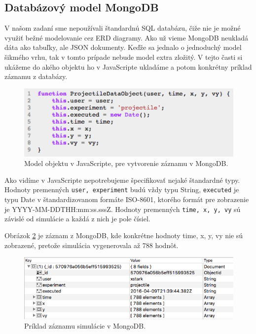 \subsection{Databázový model MongoDB}
V našom zadaní sme nepoužívali štandardnú SQL databázu, čiže nie je možné využiť bežné modelovanie cez ERD diagramy. Ako už vieme MongoDB neukladá dáta ako tabuľky, ale JSON dokumenty. Keďže sa jednalo o jednoduchý model šikmého vrhu, tak v tomto prípade nebude model extra zložitý. V tejto časti si ukážeme do akého objektu ho v JavaScripte ukladáme a potom konkrétny príklad záznamu z databázy.

\begin{figure}[H]
  \centering
  \includegraphics[scale=0.8]{img/code/javascript-projectile-model.png}
  \caption{Model objektu v JavaScripte, pre vytvorenie záznamu v MongoDB.}
  \label{img-js-projectile-model}
\end{figure}

Ako vidíme v JavaScripte nepotrebujeme špecifikovať nejaké štandardné typy. Hodnoty premenných \verb|user, experiment| budú vždy typu String, \verb|executed| je typu Date v štandardizovanom formáte ISO-8601, ktorého formát pre zobrazenie je YYYY-MM-DDTHH:mm:ss.sssZ. Hodnoty premenných \verb|time, x, y, vy| sú závislé od simulácie a každá z nich je pole čísiel.

Obrázok \ref{img-mongo-record} je záznam z MongoDB, kde konkrétne hodnoty time, x, y, vy nie sú zobrazené, pretože simulácia vygenerovala až 788 hodnôt.

\begin{figure}[H]
  \centering
  \includegraphics[scale=0.7]{img/code/mongodb-record.png}
  \caption{Príklad záznamu simulácie v MongoDB.}
  \label{img-mongo-record}
\end{figure}

